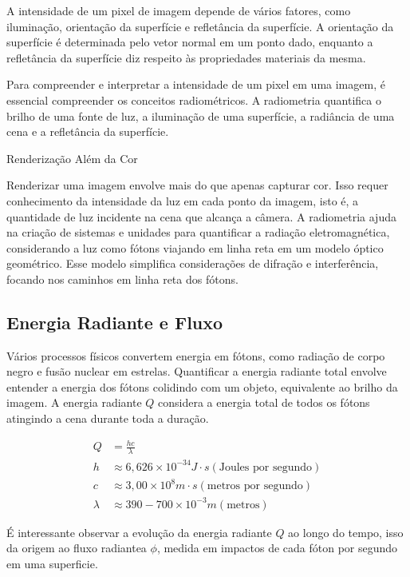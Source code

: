 \documentclass[english, 
               brazil, 
               bsc] %
               {dcomp-abntex2}
\begin{document}
A intensidade de um pixel de imagem depende de vários fatores, como iluminação, orientação da superfície e refletância da superfície. A orientação da superfície é determinada pelo vetor normal em um ponto dado, enquanto a refletância da superfície diz respeito às propriedades materiais da mesma.

Para compreender e interpretar a intensidade de um pixel em uma imagem, é essencial compreender os conceitos radiométricos. A radiometria quantifica o brilho de uma fonte de luz, a iluminação de uma superfície, a radiância de uma cena e a refletância da superfície.

Renderização Além da Cor

Renderizar uma imagem envolve mais do que apenas capturar cor. Isso requer conhecimento da intensidade da luz em cada ponto da imagem, isto é, a quantidade de luz incidente na cena que alcança a câmera. A radiometria ajuda na criação de sistemas e unidades para quantificar a radiação eletromagnética, considerando a luz como fótons viajando em linha reta em um modelo óptico geométrico. Esse modelo simplifica considerações de difração e interferência, focando nos caminhos em linha reta dos fótons.

\subsection{Energia Radiante e Fluxo} \label{fluxo}

Vários processos físicos convertem energia em fótons, como radiação de corpo negro e fusão nuclear em estrelas. Quantificar a energia radiante total envolve entender a energia dos fótons colidindo com um objeto, equivalente ao brilho da imagem. A energia radiante $Q$ considera a energia total de todos os fótons atingindo a cena durante toda a duração.

\begin{align*} 
Q &= \frac{hc}{\lambda} \\
  h &\approx 6,626 \times 10^{-34} J \cdot s (\text{Joules por segundo})\\
  c &\approx 3,00  \times 10^{8} m \cdot s (\text{metros por segundo})\\
  \lambda &\approx 390-700  \times 10^{-3} m (\text{metros})
\end{align*}


É interessante observar a evolução da energia radiante $Q$ ao longo do tempo, isso da origem ao fluxo radiantea $\phi$, medida em impactos de cada fóton por segundo em uma superficie.
\end{document}
